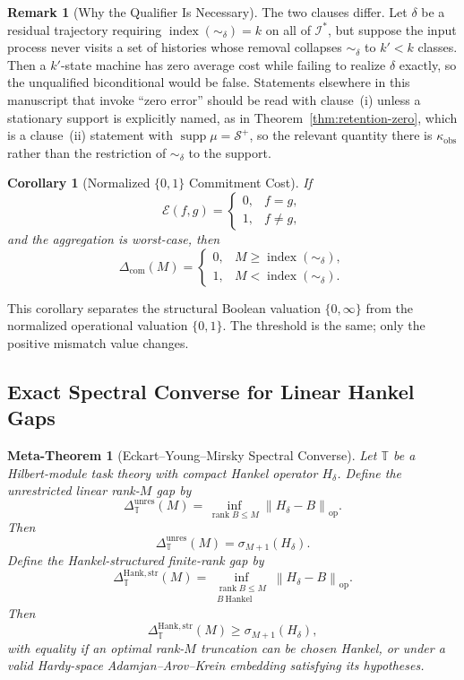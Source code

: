 \documentclass[12pt]{article}
\newtheorem{corollary}[theorem]{Corollary}
\newtheorem{metatheorem}[theorem]{Meta-Theorem}
\theoremstyle{definition}
\newtheorem{remark}[theorem]{Remark}
\newcommand{\norm}[1]{\left\lVert#1\right\rVert}
\newcommand{\Com}{\Delta_{\mathrm{com}}}
\newcommand{\Splus}{\mathcal S^{+}}
\begin{document}
\begin{remark}[Why the Qualifier Is Necessary]
\label{rem:boolean-aggregation-qualifier}
The two clauses differ.  Let $\delta$ be a residual trajectory
requiring $\operatorname{index}(\sim_\delta)=k$ on all of $\mathcal I^*$, but
suppose the input process never visits a set of histories whose removal
collapses $\sim_\delta$ to $k'<k$ classes.  Then a $k'$-state machine has zero
average cost while failing to realize $\delta$ exactly, so the unqualified
biconditional would be false.  Statements elsewhere in this manuscript that
invoke ``zero error'' should be read with clause~(i) unless a stationary
support is explicitly named, as in Theorem~\ref{thm:retention-zero}, which is
a clause~(ii) statement with $\operatorname{supp}\mu=\Splus$, so the
relevant quantity there is $\kappa_{\mathrm{obs}}$ rather than the restriction
of $\sim_\delta$ to the support.
\end{remark}

\begin{corollary}[Normalized $\{0,1\}$ Commitment Cost]
\label{cor:boolean-01}
If
\[
\mathcal E(f,g)=
\begin{cases}
0,&f=g,\\
1,&f\neq g,
\end{cases}
\]
and the aggregation is worst-case, then
\[
\Com(M)=
\begin{cases}
0,&M\ge\operatorname{index}(\sim_\delta),\\
1,&M<\operatorname{index}(\sim_\delta).
\end{cases}
\]
\end{corollary}

This corollary separates the structural Boolean valuation $\{0,\infty\}$ from
the normalized operational valuation $\{0,1\}$.  The threshold is the same;
only the positive mismatch value changes.

\subsection{Exact Spectral Converse for Linear Hankel Gaps}
\label{subsec:meta-spectral}

\begin{metatheorem}[Eckart--Young--Mirsky Spectral Converse]
\label{meta:spectral}
Let $\mathbb T$ be a Hilbert-module task theory with compact Hankel operator
$H_\delta$.  Define the unrestricted linear rank-$M$ gap by
\[
\Delta_{\mathbb T}^{\mathrm{unres}}(M)
=
\inf_{\operatorname{rank}B\le M}
\norm{H_\delta-B}_{\mathrm{op}}.
\]
Then
\[
\Delta_{\mathbb T}^{\mathrm{unres}}(M)
=
\sigma_{M+1}(H_\delta).
\]
Define the Hankel-structured finite-rank gap by
\[
\Delta_{\mathbb T}^{\mathrm{Hank,str}}(M)
=
\inf_{\substack{
\operatorname{rank}B\le M\\
B\ \text{Hankel}
}}
\norm{H_\delta-B}_{\mathrm{op}}.
\]
Then
\[
\Delta_{\mathbb T}^{\mathrm{Hank,str}}(M)
\ge
\sigma_{M+1}(H_\delta),
\]
with equality if an optimal rank-$M$ truncation can be chosen Hankel, or under
a valid Hardy-space Adamjan--Arov--Krein embedding satisfying its hypotheses.
\end{metatheorem}
\end{document}
